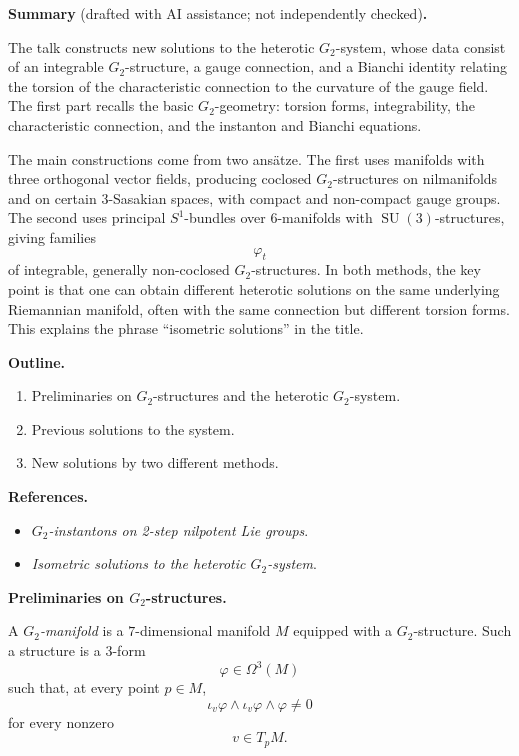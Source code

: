 \medskip\noindent
{\bf Summary} (drafted with AI assistance;
not independently checked){\bf .}

The talk constructs new solutions to
the heterotic $G_2$-system, whose data
consist of an integrable
$G_2$-structure, a gauge connection,
and a Bianchi identity relating the
torsion of the characteristic
connection to the curvature of the
gauge field.
The first part recalls the basic
$G_2$-geometry: torsion forms,
integrability, the characteristic
connection, and the instanton and
Bianchi equations.

The main constructions come from two
ansätze.
The first uses manifolds with three
orthogonal vector fields, producing
coclosed $G_2$-structures on
nilmanifolds and on certain
$3$-Sasakian spaces, with compact and
non-compact gauge groups.
The second uses principal
$S^1$-bundles over $6$-manifolds with
$\operatorname{SU}(3)$-structures,
giving families
\[
        \varphi_t
\]
of integrable, generally non-coclosed
$G_2$-structures.
In both methods, the key point is that
one can obtain different heterotic
solutions on the same underlying
Riemannian manifold, often with the
same connection but different torsion
forms.
This explains the phrase
``isometric solutions'' in the title.

\medskip\noindent
{\bf Outline.}

\begin{enumerate}
\item Preliminaries on $G_2$-structures
and the heterotic $G_2$-system.
\item Previous solutions to the
system.
\item New solutions by two different
methods.
\end{enumerate}

\medskip\noindent
{\bf References.}

\begin{itemize}
\item {\it $G_2$-instantons on
2-step nilpotent Lie groups}.
\item {\it Isometric solutions to the
heterotic $G_2$-system}.
\end{itemize}

\medskip\noindent
{\bf Preliminaries on $G_2$-structures.}

\begin{definition}
\label{definition-g-2}
A {\it $G_2$-manifold} is a
$7$-dimensional manifold $M$ equipped
with a $G_2$-structure.
Such a structure is a $3$-form
\[
        \varphi\in\Omega^3(M)
\]
such that, at every point $p\in M$,
\[
        \iota_v\varphi\wedge
        \iota_v\varphi\wedge\varphi
        \neq 0
\]
for every nonzero
\[
        v\in T_pM.
\]
\end{definition}

